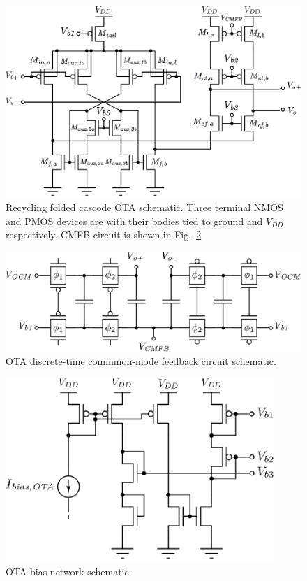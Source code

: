 \begin{figure}[!t]
	\centering
	\includegraphics[width=5.5in]{./Figures/Filter/OTA_post.eps}
	\caption[Recycling folded cascode OTA schematic.]{Recycling folded cascode OTA schematic. Three terminal NMOS and PMOS devices are with their bodies tied to ground and $V_\textit{DD}$ respectively. CMFB circuit is shown in Fig.~\ref{fig:CMFB_post}}\label{fig:OTA_post}
\end{figure}
\begin{figure}[!t]
	\centering
	\includegraphics[width=4.6in]{./Figures/Filter/CMFB_post.eps}
	\caption{OTA discrete-time commmon-mode feedback circuit schematic.}\label{fig:CMFB_post}
\end{figure}
\begin{figure}[!t]
	\centering
	\includegraphics[width=4in]{./Figures/Filter/bias_ota_post.eps}
	\caption{OTA bias network schematic.}\label{fig:bias_ota_post}
\end{figure}
